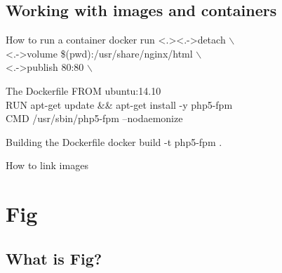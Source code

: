 \documentclass{beamer}
\begin{document}
    \subsection{Working with images and containers}
    \begin{frame}{How to run a container}
        \alert<+>{docker run}
        \alert<.>{\only<.->{\textendash\textendash detach $\backslash$\\}}
        \alert<+>{\only<.->{\textendash\textendash volume \$(pwd):/usr/share/nginx/html $\backslash$\\}}
        \alert<+>{\only<.->{\textendash\textendash publish 80:80 $\backslash$\\}}
    \end{frame}
    \begin{frame}{The Dockerfile}
        \alert<+>{}
        \alert<+>{FROM ubuntu:14.10\\}
        \alert<+>{RUN apt-get update \&\& apt-get install -y php5-fpm\\}
        \alert<+>{CMD /usr/sbin/php5-fpm --nodaemonize\\}
    \end{frame}
    \begin{frame}{Building the Dockerfile}
        docker build -t php5-fpm .
    \end{frame}
    \begin{frame}{How to link images}
    \end{frame}
    \section{Fig}
    \subsection{What is Fig?}
    \begin{frame}{}
    \end{frame}
\end{document}
